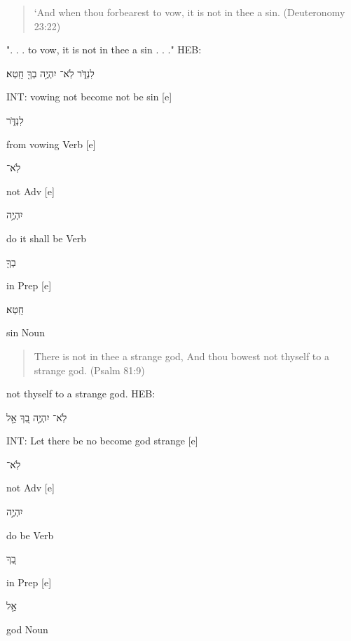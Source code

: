 \documentclass[11pt]{article}
\begin{document}
\begin{quote}
`And when thou forbearest to vow, it is not in thee a sin.
(Deuteronomy 23:22)
\end{quote}
". . . to vow, it is not in thee a sin . . ."
HEB:\begin{hebrew} לִנְדֹּ֑ר לֹֽא־ יִהְיֶ֥ה בְךָ֖ חֵֽטְא׃ \end{hebrew}\newline
INT: vowing not become not be sin [e]%
\begin{hebrew}	לִנְדֹּ֑ר	\end{hebrew}from vowing	Verb [e]%
\begin{hebrew}	לֹֽא־	\end{hebrew}not	Adv [e]%
\begin{hebrew}יִהְיֶ֥ה\end{hebrew}	do it shall be	Verb\newline
\phantom{1961 [e]	}\begin{hebrew}בְךָ֖\end{hebrew}	in	Prep [e]%
\begin{hebrew} חֵֽטְא׃  \end{hebrew}	sin	Noun\newline \newline

\begin{quote}
There is not in thee a strange god, And thou bowest not thyself to a strange god. (Psalm 81:9) 
\end{quote}
not thyself to a strange god. \newline 
HEB:\begin{hebrew} לֹֽא־ יִהְיֶ֣ה בְ֭ךָ אֵ֣ל \end{hebrew}\newline
INT: Let there be no become god strange [e]%
\begin{hebrew}	לֹֽא־	\end{hebrew}not	Adv [e]%
\begin{hebrew}	יִהְיֶ֣ה	\end{hebrew}do be	Verb\newline
\phantom{1961 [e]	}\begin{hebrew} בְ֭ךָ	\end{hebrew}in	Prep [e]%
\begin{hebrew}	אֵ֣ל \end{hebrew}	god	Noun\newline \newline
\end{document}
